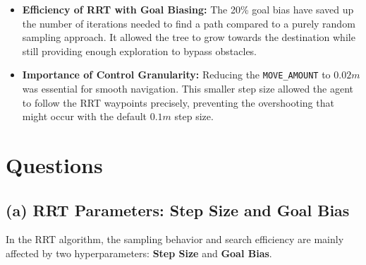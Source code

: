 \documentclass{article}
\begin{document}
\begin{itemize}
    \item \textbf{Efficiency of RRT with Goal Biasing:} The 20\% goal bias have saved up the number of 
    iterations needed to find a path compared to a purely random sampling approach. It allowed the tree 
    to grow towards the destination while still providing enough exploration to bypass obstacles.
    \item \textbf{Importance of Control Granularity:} Reducing the \texttt{MOVE\_AMOUNT} to $0.02m$ was 
    essential for smooth navigation. This smaller step size allowed the agent to follow the RRT waypoints 
    precisely, preventing the overshooting that might occur with the default $0.1m$ step size.
\end{itemize}

\section{Questions}

\subsection{(a) RRT Parameters: Step Size and Goal Bias}

In the RRT algorithm, the sampling behavior and search efficiency are mainly affected 
by two hyperparameters: \textbf{Step Size} and \textbf{Goal Bias}.
\end{document}

